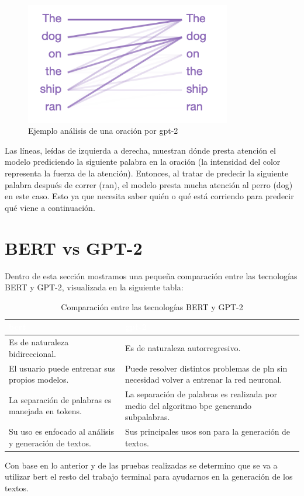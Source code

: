 \documentclass[12pt, a4paper, titlepage]{report}
\begin{document}
		    	\begin{figure}[H] \caption{Ejemplo análisis de una oración por \acrshort{gpt}-2 \cite{refarquitecturagpt3}}
		    		\includegraphics[width=9cm]{./imagenes/MarcoTeorico/Gptsentence.png}
		    		\centering 
		    	\end{figure}
		    
		    	Las líneas, leídas de izquierda a derecha, muestran dónde presta atención el modelo prediciendo la siguiente palabra en la oración (la intensidad del color representa la fuerza de la atención). Entonces, al tratar de predecir la siguiente palabra después de correr (ran), el modelo presta mucha atención al perro (dog) en este caso. Esto ya que necesita saber quién o qué está corriendo para predecir qué viene a continuación. \cite{refarquitecturagpt3}    	
		    	
    	\section{BERT vs GPT-2}    	
    	Dentro de esta sección mostramos una pequeña comparación entre las tecnologías BERT y GPT-2, visualizada en la siguiente tabla:    	
    	\begin{table}[h!]
    		\begin{tabular}{|m{6.5cm}|m{6.5cm}|}
    			\hline    			
    			\rowcolor{guindapoli}
    			{\textbf{\textcolor{white}{\acrshort{bert}}}} & {\textbf{\textcolor{white}{\acrshort{gpt}-2}}}\\
    			\hline
    			Es de naturaleza bidireccional. & Es de naturaleza autorregresivo.\\
    			\hline
    			El usuario puede entrenar sus propios modelos. & Puede resolver distintos problemas de \acrfull{pln} sin necesidad volver a entrenar la red neuronal.\\
    			\hline
    			La separación de palabras es manejada en tokens. & La separación de palabras es realizada por medio del algoritmo \acrfull{bpe} generando subpalabras.\\
    			\hline
    			Su uso es enfocado al análisis y generación de textos. & Sus principales usos son para la generación de textos.\\
    			\hline
    		\end{tabular}
    		\caption[BERTvsGPT-2]{Comparación entre las tecnologías BERT y GPT-2}
    	\end{table}
        Con base en lo anterior y de las pruebas realizadas se determino que se va a utilizar \acrshort{bert} el resto del trabajo terminal para ayudarnos en la generación de los textos. \pagebreak	
        
\end{document}
